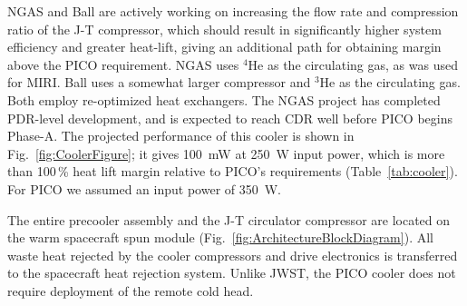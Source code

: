 NGAS and Ball are actively working on increasing the flow rate and compression ratio of the J-T compressor,  which should result in significantly higher system efficiency and greater heat-lift, giving an additional path for obtaining margin above the PICO requirement. NGAS uses $^4$He as the circulating gas, as was used for MIRI. Ball uses a somewhat larger compressor and $^3$He as the circulating gas. Both employ re-optimized heat exchangers. The NGAS project has completed PDR-level development, and is expected to reach CDR well before PICO begins Phase-A. The projected performance of this cooler is shown in Fig.~\ref{fig:CoolerFigure}; it gives 100~mW at 250~W input power, which is more than 100\,\% heat lift margin relative to PICO's requirements (Table~\ref{tab:cooler}). For PICO we assumed an input power of 350~W.

The entire precooler assembly and the J-T circulator compressor are located on the warm spacecraft spun module (Fig.~\ref{fig:ArchitectureBlockDiagram}).
All waste heat rejected by the cooler compressors and drive electronics is transferred to the spacecraft heat rejection system. Unlike JWST, the PICO cooler does not require deployment of the remote cold head.



